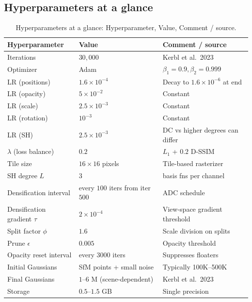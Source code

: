 \documentclass{article}
\begin{document}
\subsection{Hyperparameters at a glance}\label{hyperparameters-at-a-glance}

\begin{table}[t]
\centering
\caption{Hyperparameters at a glance: Hyperparameter, Value, Comment / source.}
\label{tab:hyperparameters-at-a-glance}
\begin{tabular}{>{\raggedright\arraybackslash}p{0.2990\linewidth}
  >{\raggedright\arraybackslash}p{0.3402\linewidth}
  >{\raggedright\arraybackslash}p{0.3608\linewidth}}
\toprule
\textbf{Hyperparameter} & \textbf{Value} & \textbf{Comment / source} \\
\midrule
Iterations & \(30{,}000\) & Kerbl et al.~2023 \\
Optimizer & Adam & \(\beta_1=0.9,\beta_2=0.999\) \\
LR (positions) & \(1.6\times 10^{-4}\) & Decay to \(1.6\times 10^{-6}\) at end \\
LR (opacity) & \(5\times 10^{-2}\) & Constant \\
LR (scale) & \(2.5\times 10^{-3}\) & Constant \\
LR (rotation) & \(10^{-3}\) & Constant \\
LR (SH) & \(2.5\times 10^{-3}\) & DC vs higher degrees can differ \\
\(\lambda\) (loss balance) & \(0.2\) & \(L_1\) + \(0.2\) D-SSIM \\
Tile size & \(16\times16\) pixels & Tile-based rasterizer \\
SH degree \(L\) & \(3\) & 16 basis fns per channel \\
Densification interval & every \(100\) iters from iter \(500\) & ADC schedule \\
Densification gradient \(\tau\) & \(2\times 10^{-4}\) & View-space gradient threshold \\
Split factor \(\phi\) & \(1.6\) & Scale division on splits \\
Prune \(\epsilon\) & \(0.005\) & Opacity threshold \\
Opacity reset interval & every \(3000\) iters & Suppresses floaters \\
Initial Gaussians & SfM points + small noise & Typically 100K--500K \\
Final Gaussians & \(1\)--\(6\) M (scene-dependent) & Kerbl et al.~2023 \\
Storage & \(0.5\)--\(1.5\) GB & Single precision \\
\end{tabular}
\end{table}
\end{document}
